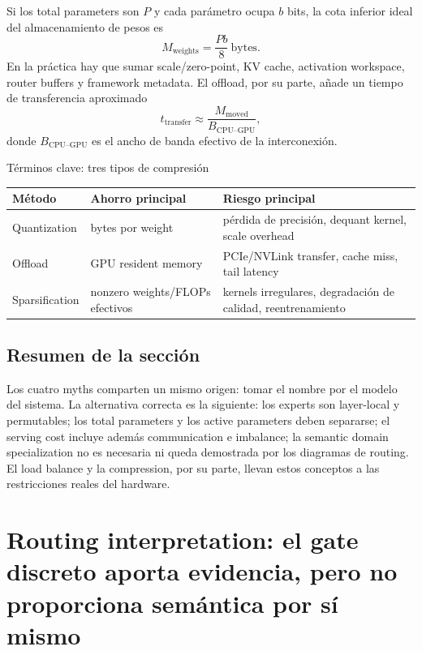 \documentclass[a4paper]{article}
\begin{document}
Si los total parameters son $P$ y cada parámetro ocupa $b$ bits, la cota inferior ideal del almacenamiento de pesos es
\[
M_{\text{weights}}=\frac{Pb}{8}\ \text{bytes}.
\]
En la práctica hay que sumar scale/zero-point, KV cache, activation workspace, router buffers y framework metadata. El offload, por su parte, añade un tiempo de transferencia aproximado
\[
t_{\text{transfer}}\approx \frac{M_{\text{moved}}}{B_{\text{CPU--GPU}}},
\]
donde $B_{\text{CPU--GPU}}$ es el ancho de banda efectivo de la interconexión.

\begin{knowledgebox}{Términos clave: tres tipos de compresión}
\begin{tabularx}{\textwidth}{L{0.18\textwidth} L{0.24\textwidth} X}
\toprule
Método & Ahorro principal & Riesgo principal \\
\midrule
Quantization & bytes por weight & pérdida de precisión, dequant kernel, scale overhead \\
Offload & GPU resident memory & PCIe/NVLink transfer, cache miss, tail latency \\
Sparsification & nonzero weights/FLOPs efectivos & kernels irregulares, degradación de calidad, reentrenamiento \\
\bottomrule
\end{tabularx}
\end{knowledgebox}


\subsection{Resumen de la sección}

Los cuatro myths comparten un mismo origen: tomar el nombre por el modelo del sistema. La alternativa correcta es la siguiente: los experts son layer-local y permutables; los total parameters y los active parameters deben separarse; el serving cost incluye además communication e imbalance; la semantic domain specialization no es necesaria ni queda demostrada por los diagramas de routing. El load balance y la compression, por su parte, llevan estos conceptos a las restricciones reales del hardware.
\section{Routing interpretation: el gate discreto aporta evidencia, pero no proporciona semántica por sí mismo}
\end{document}
